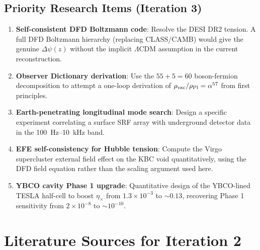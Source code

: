 \documentclass[11pt]{article}
\theoremstyle{definition}
\theoremstyle{remark}
\newcommand{\ee}[1]{\times 10^{#1}}
\begin{document}
\subsection{Priority Research Items (Iteration 3)}

\begin{enumerate}[label=\textbf{P3.\arabic*}]

\item \textbf{Self-consistent DFD Boltzmann code}: Resolve the DESI DR2
tension. A full DFD Boltzmann hierarchy (replacing CLASS/CAMB) would give
the genuine $\Delta\psi(z)$ without the implicit $\Lambda$CDM assumption
in the current reconstruction.

\item \textbf{Observer Dictionary derivation}: Use the $55+5=60$
boson-fermion decomposition to attempt a one-loop derivation of
$\rho_{\rm vac}/\rho_{\rm Pl} = \alpha^{57}$ from first principles.

\item \textbf{Earth-penetrating longitudinal mode search}: Design a
specific experiment correlating a surface SRF array with underground
detector data in the 100~Hz--10~kHz band.

\item \textbf{EFE self-consistency for Hubble tension}: Compute the
Virgo supercluster external field effect on the KBC void quantitatively,
using the DFD field equation rather than the scaling argument used here.

\item \textbf{YBCO cavity Phase 1 upgrade}: Quantitative design of the
YBCO-lined TESLA half-cell to boost $\eta_\times$ from $1.3\ee{-3}$
to $\sim 0.13$, recovering Phase 1 sensitivity from $2\ee{-8}$ to
$\sim 10^{-10}$.

\end{enumerate}


\section*{Literature Sources for Iteration 2}
\end{document}
